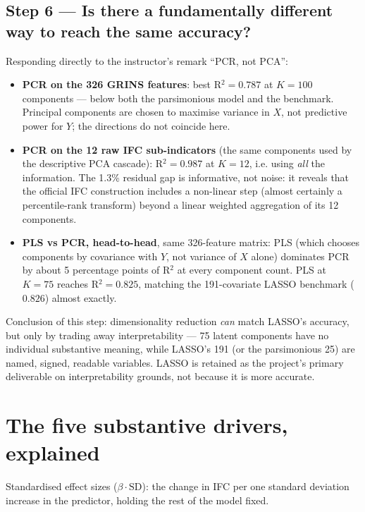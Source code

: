 \documentclass[11pt,a4paper]{article}
\begin{document}
\subsection*{Step 6 --- Is there a fundamentally different way to
reach the same accuracy?}
Responding directly to the instructor's remark ``PCR, not PCA'':
\begin{itemize}[leftmargin=2em]
  \item \textbf{PCR on the 326 GRINS features}: best R$^2 = 0.787$
  at $K=100$ components --- below both the parsimonious model and
  the benchmark. Principal components are chosen to maximise
  variance in $X$, not predictive power for $Y$; the directions do
  not coincide here.
  \item \textbf{PCR on the 12 raw IFC sub-indicators} (the same
  components used by the descriptive PCA cascade): R$^2 = 0.987$ at
  $K=12$, i.e. using \emph{all} the information. The 1.3\% residual
  gap is informative, not noise: it reveals that the official IFC
  construction includes a non-linear step (almost certainly a
  percentile-rank transform) beyond a linear weighted aggregation of
  its 12 components.
  \item \textbf{PLS vs PCR, head-to-head}, same 326-feature matrix:
  PLS (which chooses components by covariance with $Y$, not variance
  of $X$ alone) dominates PCR by about 5 percentage points of
  R$^2$ at every component count. PLS at $K=75$ reaches
  R$^2=0.825$, matching the 191-covariate LASSO benchmark
  ($0.826$) almost exactly.
\end{itemize}
Conclusion of this step: dimensionality reduction \emph{can} match
LASSO's accuracy, but only by trading away interpretability ---
75 latent components have no individual substantive meaning, while
LASSO's 191 (or the parsimonious 25) are named, signed, readable
variables. LASSO is retained as the project's primary deliverable on
interpretability grounds, not because it is more accurate.

\section{The five substantive drivers, explained}

Standardised effect sizes ($\beta \cdot \mathrm{SD}$): the change in
IFC per one standard deviation increase in the predictor, holding
the rest of the model fixed.
\end{document}

